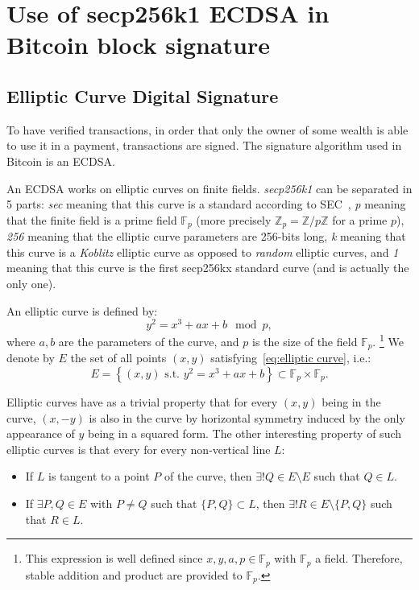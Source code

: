 \documentclass{IEEEtran}
\begin{document}
\section{Use of secp256k1 ECDSA in Bitcoin block signature}

	\subsection{Elliptic Curve Digital Signature}
	To have verified transactions, in order that only the owner of some wealth is able to use it in a
	payment, transactions are signed. The signature algorithm used in Bitcoin is an ECDSA.

	An ECDSA works on elliptic curves on finite fields. \textit{secp256k1} can be separated in 5 parts:
	\textit{sec} meaning that this curve is a standard according to SEC~\cite{SEC2}, \textit{p} meaning
	that the finite field is a prime field $\mathbb F_p$ (more precisely $\mathbb Z_p = \mathbb Z/p\mathbb Z$
	for a prime $p$), \textit{256} meaning that the elliptic curve parameters are 256-bits long, \textit{k}
	meaning that this curve is a \textit{Koblitz} elliptic curve as opposed to \textit{random} elliptic
	curves, and \textit{1} meaning that this curve is the first secp256kx standard curve (and is actually
	the only one).

	An elliptic curve is defined by:
	\begin{equation}\label{eq:elliptic curve}
		y^2 = x^3 + ax + b \mod p,
	\end{equation}
	where $a, b$ are the parameters of the curve, and $p$ is the size of the field $\mathbb F_p$.
	\footnote{This expression is well defined since $x, y, a, p \in \mathbb F_p$ with $\mathbb F_p$ a field.
	Therefore, stable addition and product are provided to $\mathbb F_p$.}
	We denote by $E$ the set of all points $(x, y)$ satisfying~\eqref{eq:elliptic curve}, i.e.:
	\[E = \left\{(x, y) \text{ s.t. } y^2 = x^3 + ax + b\right\} \subset \mathbb F_p \times \mathbb F_p.\]

	Elliptic curves have as a trivial property that for every $(x, y)$ being in the curve, $(x, -y)$ is
	also in the curve by horizontal symmetry induced by the only appearance of $y$ being in a squared
	form. The other interesting property of such elliptic curves is that every for every non-vertical
	line $L$:
	\begin{itemize}
		\item If $L$ is tangent to a point $P$ of the curve, then $\exists! Q \in E \setminus E$ such that $Q \in L$.
		\item If $\exists P, Q \in E$ with $P \neq Q$ such that $\{P, Q\} \subset L$, then $\exists! R \in E \setminus \{P, Q\}$
		such that $R \in L$.
	\end{itemize}
\end{document}
